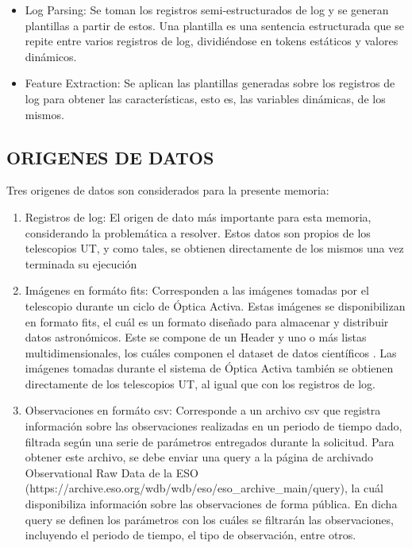 \begin{itemize}
    \item Log Parsing: Se toman los registros semi-estructurados de log y se generan plantillas a partir de estos. Una plantilla es una sentencia estructurada que se repite entre varios registros de log, dividiéndose en tokens estáticos y valores dinámicos. \cite{ma2023automatic}

    \item Feature Extraction: Se aplican las plantillas generadas sobre los registros de log para obtener las características, esto es, las variables dinámicas, de los mismos. \cite{ma2023automatic}

\end{itemize}

\subsection{ORIGENES DE DATOS}

Tres origenes de datos son considerados para la presente memoria:

\begin{enumerate}
    \item Registros de log: El origen de dato más importante para esta memoria, considerando la problemática a resolver. Estos datos son propios de los telescopios UT, y como tales, se obtienen directamente de los mismos una vez terminada su ejecución \cite{eso1998vlt}

    \item Imágenes en formáto fits: Corresponden a las imágenes tomadas por el telescopio durante un ciclo de Óptica Activa. Estas imágenes se disponibilizan en formato fits, el cuál es un formato diseñado para almacenar y distribuir datos astronómicos. Este se compone de un Header y uno o más listas multidimensionales, los cuáles componen el dataset de datos científicos \cite{nasa2025fits}. Las imágenes tomadas durante el sistema de Óptica Activa también se obtienen directamente de los telescopios UT, al igual que con los registros de log.

    \item Observaciones en formáto csv: Corresponde a un archivo csv que registra información sobre las observaciones realizadas en un periodo de tiempo dado, filtrada según una serie de parámetros entregados durante la solicitud. Para obtener este archivo, se debe enviar una query a la página de archivado Observational Raw Data de la ESO (https://archive.eso.org/wdb/wdb/eso/eso\_archive\_main/query), la cuál disponibiliza información sobre las observaciones de forma pública. En dicha query se definen los parámetros con los cuáles se filtrarán las observaciones, incluyendo el periodo de tiempo, el tipo de observación, entre otros.
\end{enumerate}